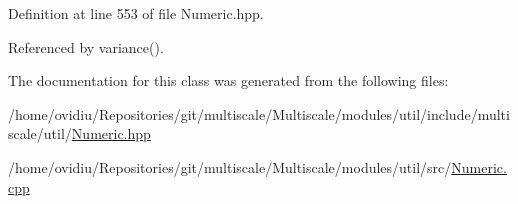 \-Definition at line 553 of file \-Numeric.\-hpp.



\-Referenced by variance().



\-The documentation for this class was generated from the following files\-:\begin{DoxyCompactItemize}
\item 
/home/ovidiu/\-Repositories/git/multiscale/\-Multiscale/modules/util/include/multiscale/util/\hyperlink{Numeric_8hpp}{\-Numeric.\-hpp}\item 
/home/ovidiu/\-Repositories/git/multiscale/\-Multiscale/modules/util/src/\hyperlink{Numeric_8cpp}{\-Numeric.\-cpp}\end{DoxyCompactItemize}
